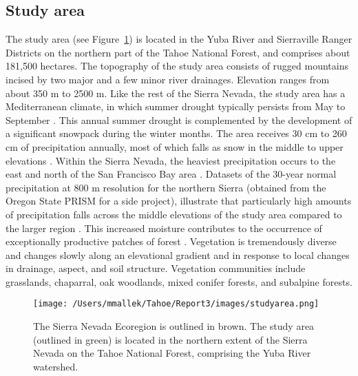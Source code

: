 \subsection*{Study area}
The study area (see Figure~\ref{projectarea-ch3}) is located in the Yuba River and Sierraville Ranger Districts on the northern part of the Tahoe National Forest, and comprises about 181,500 hectares. The topography of the study area consists of rugged mountains incised by two major and a few minor river drainages. Elevation ranges from about 350 m to 2500 m. Like the rest of the Sierra Nevada, the study area has a Mediterranean climate, in which summer drought typically persists from May to September \citep{Minnich2007,Skinner1996}. This annual summer drought is complemented by the development of a significant snowpack during the winter months. The area receives 30 cm to 260 cm of precipitation annually, most of which falls as snow in the middle to upper elevations \citep{Storer1963}. Within the Sierra Nevada, the heaviest precipitation occurs to the east and north of the San Francisco Bay area \citep{VanWag2006}. Datasets of the 30-year normal precipitation at 800 m resolution for the northern Sierra (obtained from the Oregon State PRISM for a side project), illustrate that particularly high amounts of precipitation falls across the middle elevations of the study area compared to the larger region \citep{PRISMClimateGroup2004}. This increased moisture contributes to the occurrence of exceptionally productive patches of forest \citep{Littell2012}. Vegetation is tremendously diverse and changes slowly along an elevational gradient and in response to local changes in drainage, aspect, and soil structure. Vegetation communities include grasslands, chaparral, oak woodlands, mixed conifer forests, and subalpine forests.

\begin{figure}
\centering
\texttt{[image: /Users/mmallek/Tahoe/Report3/images/studyarea.png]}
\caption{The Sierra Nevada Ecoregion is outlined in brown. The study area (outlined in green) is located in the northern extent of the Sierra Nevada on the Tahoe National Forest, comprising the Yuba River watershed.}
\label{projectarea-ch3}
\end{figure}

